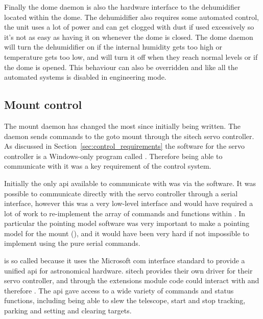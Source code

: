 \begin{colsection}
\begin{colsection}
Finally the dome daemon is also the hardware interface to the dehumidifier located within the dome. The dehumidifier also requires some automated control, the unit uses a lot of power and can get clogged with dust if used excessively so it's not as easy as having it on whenever the dome is closed. The dome daemon will turn the dehumidifier on if the internal humidity gets too high or temperature gets too low, and will turn it off when they reach normal levels or if the dome is opened. This behaviour can also be overridden and like all the automated systems is disabled in engineering mode.

\end{colsection}


\subsection{Mount control}
\label{sec:mount}
\begin{colsection}

The mount daemon has changed the most since initially being written. The daemon sends commands to the \gls{goto} mount through the \gls{sitech} servo controller. As discussed in Section~\ref{sec:control_requirements} the software for the servo controller is a Windows-only program called . Therefore being able to communicate with it was a key requirement of the control system.

Initially the only \gls{api} available to communicate with  was via the  software. It was possible to communicate directly with the servo controller through a serial interface, however this was a very low-level interface and would have required a lot of work to re-implement the array of commands and functions within . In particular the  pointing model software was very important to make a pointing model for the mount (), and it would have been very hard if not impossible to implement using the pure serial commands.

 is so called because it uses the Microsoft \gls{com} interface standard to provide a unified \gls{api} for astronomical hardware. \gls{sitech} provides their own  driver for their servo controller, and through the   extensions module  code could interact with  and therefore . The  \gls{api} gave access to a wide variety of commands and status functions, including being able to slew the telescope, start and stop tracking, parking and setting and clearing targets.


\end{colsection}
\end{colsection}
